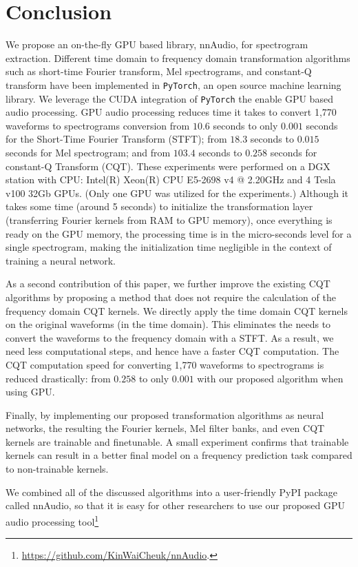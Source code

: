 \documentclass{ieeeaccess}
\newcommand{\nbh}[1]{\texttt{#1}}
\begin{document}
\section{Conclusion}
We propose an on-the-fly GPU based library, nnAudio, for spectrogram extraction. Different time domain to frequency domain transformation algorithms such as short-time Fourier transform, Mel spectrograms, and constant-Q transform have been implemented in \nbh{PyTorch}, an open source machine learning library. We leverage the CUDA integration of \nbh{PyTorch} the enable GPU based audio processing. GPU audio processing reduces time it takes to convert 1,770 waveforms to spectrograms conversion from $10.6$ seconds to only $0.001$ seconds for the Short-Time Fourier Transform (STFT); from $18.3$ seconds to $0.015$ seconds for Mel spectrogram; and from $103.4$ seconds to $0.258$ seconds for constant-Q Transform (CQT). These experiments were performed on a DGX station with CPU: Intel(R) Xeon(R) CPU E5-2698 v4 @ 2.20GHz and 4 Tesla v100 32Gb GPUs. (Only one GPU was utilized for the experiments.) Although it takes some time (around 5 seconds) to initialize the transformation layer (transferring Fourier kernels from RAM to GPU memory), once everything is ready on the GPU memory, the processing time is in the micro-seconds level for a single spectrogram, making the initialization time negligible in the context of training a neural network. 

As a second contribution of this paper, we further improve the existing CQT algorithms by proposing a method that does not require the calculation of the frequency domain CQT kernels. We directly apply the time domain CQT kernels on the original waveforms (in the time domain). This eliminates the needs to convert the waveforms to the frequency domain with a STFT. As a result, we need less computational steps, and hence have a faster CQT computation. The CQT computation speed for converting 1,770 waveforms to spectrograms is reduced drastically: from $0.258$ to only $0.001$ with our proposed algorithm when using GPU.

Finally, by implementing our proposed transformation algorithms as neural networks, the resulting the Fourier kernels, Mel filter banks, and even CQT kernels are trainable and finetunable. A small experiment confirms that trainable kernels can result in a better final model on a frequency prediction task compared to non-trainable kernels. 

We combined all of the discussed algorithms into a user-friendly PyPI package called nnAudio, so that it is easy for other researchers to use our proposed GPU audio processing tool\footnote{\url{https://github.com/KinWaiCheuk/nnAudio}.} 
\end{document}
